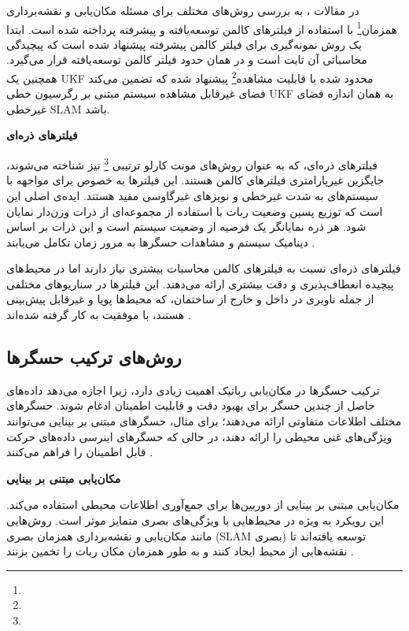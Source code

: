  
در مقالات 
\cite{huang2013quadratic, kim2008unscented, cheng2014compressed}
، به بررسی روش‌های مختلف برای مسئله مکان‌یابی و نقشه‌برداری همزمان\footnote{}
 با استفاده از فیلترهای کالمن توسعه‌یافته و پیشرفته پرداخته شده است. ابتدا یک روش نمونه‌گیری برای فیلتر کالمن پیشرفته پیشنهاد شده است که پیچیدگی محاسباتی آن ثابت است و در همان حدود فیلتر کالمن توسعه‌یافته قرار می‌گیرد. همچنین یک UKF محدود شده با قابلیت مشاهده\footnote{} پیشنهاد شده که تضمین می‌کند فضای غیرقابل مشاهده سیستم مبتنی بر رگرسیون خطی UKF به همان اندازه فضای غیرخطی SLAM باشد.
 

\textbf {فیلترهای ذره‌ای}

فیلترهای ذره‌ای، که به عنوان روش‌های مونت کارلو ترتیبی
\footnote{}
 نیز شناخته می‌شوند، جایگزین غیرپارامتری فیلترهای کالمن هستند. این فیلترها به خصوص برای مواجهه با سیستم‌های به شدت غیرخطی و نویزهای غیرگاوسی مفید هستند. ایده‌ی اصلی این است که توزیع پسین وضعیت ربات با استفاده از مجموعه‌ای از ذرات وزن‌دار نمایان شود. هر ذره نمایانگر یک فرضیه از وضعیت سیستم است و این ذرات بر اساس دینامیک سیستم و مشاهدات حسگرها به مرور زمان تکامل می‌یابند
\cite{fox2001particle}.

فیلترهای ذره‌ای نسبت به فیلترهای کالمن محاسبات بیشتری نیاز دارند اما در محیط‌های پیچیده انعطاف‌پذیری و دقت بیشتری ارائه می‌دهند. این فیلترها در سناریوهای مختلفی از جمله ناوبری در داخل و خارج از ساختمان، که محیط‌ها پویا و غیرقابل پیش‌بینی هستند، با موفقیت به کار گرفته شده‌اند
 \cite{fox2001particle, montemerlo2002conditional, kwok2003adaptive}.

\subsection{روش‌های ترکیب حسگرها}

ترکیب حسگرها در مکان‌یابی رباتیک اهمیت زیادی دارد، زیرا اجازه می‌دهد داده‌های حاصل از چندین حسگر برای بهبود دقت و قابلیت اطمینان ادغام شوند. حسگرهای مختلف اطلاعات متفاوتی ارائه می‌دهند؛ برای مثال، حسگرهای مبتنی بر بینایی می‌توانند ویژگی‌های غنی محیطی را ارائه دهند، در حالی که حسگرهای اینرسی داده‌های حرکت قابل اطمینان را فراهم می‌کنند
\cite{srinivasan2007multiple}.

\textbf{مکان‌یابی مبتنی بر بینایی}

مکان‌یابی مبتنی بر بینایی از دوربین‌ها برای جمع‌آوری اطلاعات محیطی استفاده می‌کند. این رویکرد به ویژه در محیط‌هایی با ویژگی‌های بصری متمایز موثر است. روش‌هایی مانند مکان‌یابی و نقشه‌برداری همزمان بصری (SLAM بصری) توسعه یافته‌اند تا نقشه‌هایی از محیط ایجاد کنند و به طور همزمان مکان ربات را تخمین بزنند
 \cite{westman2018underwater, hiebert2022introduction}.

